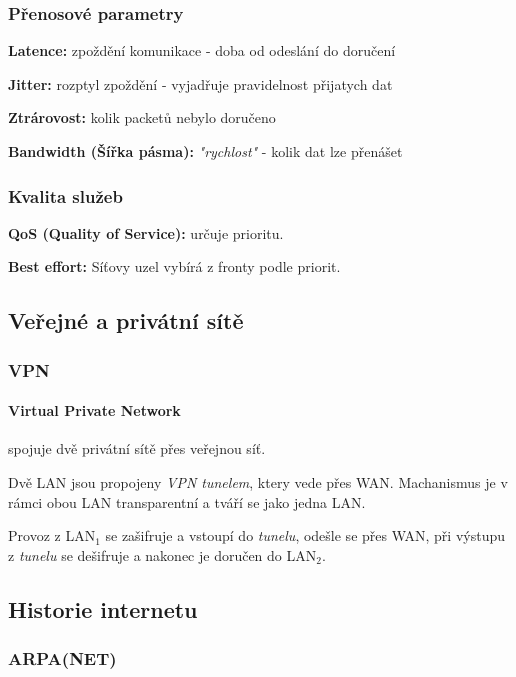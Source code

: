 \documentclass[10pt,a4paper]{article}
\begin{document}
\subsubsection{Přenosové parametry}

\textbf{Latence:} zpoždění komunikace - doba od odeslání do doručení

\textbf{Jitter:} rozptyl zpoždění - vyjadřuje pravidelnost přijatych dat

\textbf{Ztrárovost:} kolik packetů nebylo doručeno

\textbf{Bandwidth (Šířka pásma):} \textit{"rychlost"} - kolik dat lze přenášet

\subsubsection{Kvalita služeb}

\textbf{QoS (Quality of Service):} určuje prioritu.

\textbf{Best effort:}
Síťovy uzel vybírá z fronty podle priorit.

\subsection{Veřejné a privátní sítě}

\subsubsection{VPN}

\paragraph{Virtual Private Network} spojuje dvě privátní sítě přes veřejnou síť.

Dvě LAN jsou propojeny \textit{VPN tunelem}, ktery vede přes WAN.
Machanismus je v rámci obou LAN transparentní a tváří se jako jedna LAN.

Provoz z LAN$_1$ se zašifruje a vstoupí do \textit{tunelu}, odešle se přes WAN, při výstupu z \textit{tunelu} se dešifruje a nakonec je doručen do LAN$_2$. 

\subsection{Historie internetu}

\subsubsection{ARPA(NET)}
\end{document}
